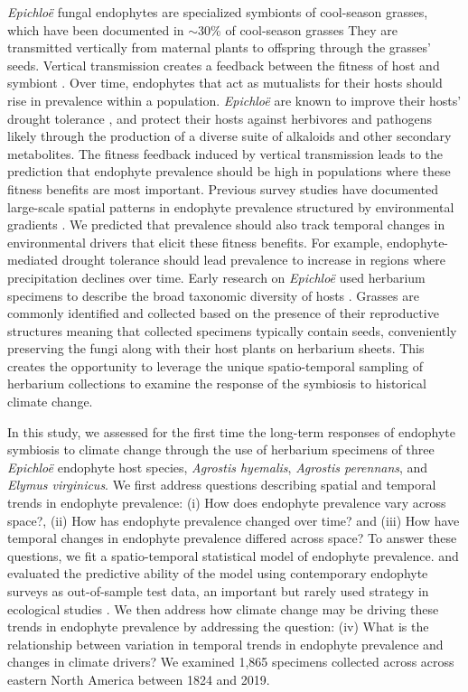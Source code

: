\documentclass[11pt]{article}
\let\cite\citep
\begin{document}
\emph{Epichloë} fungal endophytes are specialized symbionts of cool-season grasses, which have been documented in $\sim 30$\% of cool-season grasses \citep{leuchtmann1992systematics}
They are transmitted vertically from maternal plants to offspring through the grasses' seeds.
Vertical transmission creates a feedback between the fitness of host and symbiont \citep{fine1975vectors, douglas1998host, rudgers2009fungus}. 
Over time, endophytes that act as mutualists for their hosts should rise in prevalence within a population. 
\emph{Epichloë} are known to improve their hosts' drought tolerance \cite{decunta2021systematic}, and protect their hosts against herbivores \cite{crawford2010fungal} and pathogens \cite{xia2018role} likely through the production of a diverse suite of alkaloids and other secondary metabolites.
The fitness feedback induced by vertical transmission leads to the prediction that endophyte prevalence should be high in populations where these fitness benefits are most important. 
Previous survey studies have documented large-scale spatial patterns in  endophyte prevalence structured by environmental gradients \citep{granath2007variation,bazely2007broad, afkhami2012fungal,sneck2017variation}.
We predicted that prevalence should also track temporal changes in environmental drivers that elicit these fitness benefits.
For example, endophyte-mediated drought tolerance should lead prevalence to increase in regions where precipitation declines over time.
Early research on \emph{Epichloë} used herbarium specimens to describe the broad taxonomic diversity of hosts \citep{white1985endophyte}. 
Grasses are commonly identified and collected based on the presence of their reproductive structures meaning that collected specimens typically contain seeds, conveniently preserving the fungi along with their host plants on herbarium sheets. 
This creates the opportunity to leverage the unique spatio-temporal sampling of herbarium collections to examine the response of the symbiosis to historical climate change.

In this study, we assessed for the first time the long-term responses of endophyte symbiosis to climate change through the use of herbarium specimens of three \emph{Epichloë} endophyte host species, \emph{Agrostis hyemalis}, \emph{Agrostis perennans}, and \emph{Elymus virginicus}.
We first address questions describing spatial and temporal trends in endophyte prevalence: (i) How does endophyte prevalence vary across space?, (ii) How has endophyte prevalence changed over time? and (iii) How have temporal changes in endophyte prevalence differed across space?
To answer these questions, we fit a spatio-temporal statistical model of endophyte prevalence.
and evaluated the predictive ability of the model using contemporary endophyte surveys as out-of-sample test data, an important but rarely used strategy in ecological studies \cite{tredennick2021practical}. 
We then address how climate change may be driving these trends in endophyte prevalence by addressing the question: (iv) What is the relationship between variation in temporal trends in endophyte prevalence and changes in climate drivers?
We examined 1,865 specimens collected across across eastern North America between 1824 and 2019.
	
\end{document}
